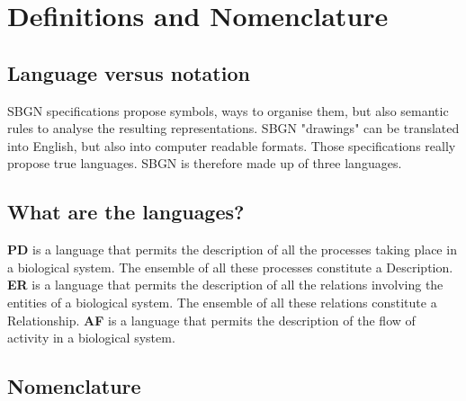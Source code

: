 

\section{Definitions and Nomenclature}

\subsection{Language versus notation}

SBGN specifications propose symbols, ways to organise them, but also semantic rules to analyse the resulting representations. SBGN "drawings" can be translated into English, but also into computer readable formats. Those specifications really propose true languages. SBGN is therefore made up of three languages.

\subsection{What are the languages?}

\textbf{PD} is a language that permits the description of all the processes taking place in a biological system. The ensemble of all these processes constitute a Description. \textbf{ER} is a language that permits the description of all the relations involving the entities of a biological system. The ensemble of all these relations constitute a Relationship.\textbf{ AF} is a language that permits the description of the flow of activity in a biological system.

\subsection{Nomenclature}

